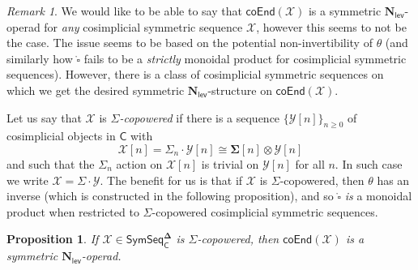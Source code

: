 \documentclass[11pt]{amsart}
\newtheorem{proposition}[subsection]{Proposition}
\theoremstyle{definition}
\theoremstyle{remark}
\newtheorem{remark}[subsection]{Remark}
\newcommand{\SymSeq}{\mathsf{SymSeq}}
\newcommand{\Cal}[1]{\mathcal{#1}}
\newcommand{\boxcirc}{\mathring{\square}}
\newcommand{\Nl}{\mathbf{N}_{\mathsf{lev}}}
\newcommand{\bdel}{\mathbf{\Delta}}
\newcommand{\coend}[1]{\mathsf{coEnd}(\Cal{#1})}
\begin{document}
\begin{remark} \label{def:Sigma-copowered}
    We would like to be able to say that $\coend{X}$ is a symmetric $\Nl$-operad for \textit{any} cosimplicial symmetric sequence $\Cal{X}$, however this seems to not be the case. The issue seems to be based on the potential non-invertibility of $\theta$ (and similarly how $\boxcirc$ fails to be a \textit{strictly} monoidal product for cosimplicial symmetric sequences). However, there is a class of cosimplicial symmetric sequences on which we get the desired symmetric $\Nl$-structure on $\coend{\Cal{X}}$. 
    
    Let us say that $\Cal{X}$ is \textit{$\Sigma$-copowered} if there is a sequence $\{\Cal{Y}[n]\}_{n\geq 0}$ of cosimplicial objects in $\mathsf{C}$ with \[ \Cal{X}[n] = \Sigma_n {\cdot} \Cal{Y}[n] \cong \mathbf{\Sigma}[n]\otimes \Cal{Y}[n]\]
    and such that the $\Sigma_n$ action on $\Cal{X}[n]$ is trivial on $\Cal{Y}[n]$ for all $n$. In such case we write $\Cal{X}= \Sigma {\cdot} \Cal{Y}$. The benefit for us is that if $\Cal{X}$ is $\Sigma$-copowered, then $\theta$ has an inverse (which is constructed in the following proposition), and so $\boxcirc$ \textit{is} a monoidal product when restricted to $\Sigma$-copowered cosimplicial symmetric sequences.
\end{remark}


\begin{proposition} \label{prop:coend-X}
    If $\Cal{X}\in \SymSeq_{\mathsf{C}}^{\bdel}$ is $\Sigma$-copowered, then $\mathsf{coEnd}(\Cal{X})$ is a symmetric $\Nl$-operad.
\end{proposition}
\end{document}
